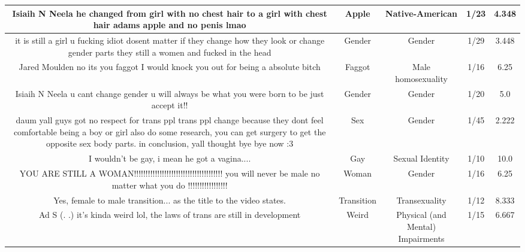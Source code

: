 \documentclass[11pt]{article}
\newlength\mylength
\begin{document}
\begin{center}
\begin{longtable}{|C{.40\mylength}|C{.30\mylength}|C{.15\mylength}|C{.15\mylength}|C{.15\mylength}|}
   Isiaih N Neela he changed from girl with no chest hair to a girl with chest hair adams apple and no penis lmao  & Apple & Native-American & 1/23 & 4.348 \\  \hline
  it is still a girl u fucking idiot dosent matter if they change how they look or change gender parts they still a women and fucked in the head  & Gender & Gender & 1/29 & 3.448 \\  \hline
   Jared Moulden no its you faggot I would knock you out for being a absolute bitch  & Faggot & Male homosexuality & 1/16 & 6.25 \\  \hline
  Isiaih N Neela u cant change gender u will always be what you were born to be just accept it!!  & Gender & Gender & 1/20 & 5.0 \\  \hline
  daum yall guys got no respect for trans ppl  trans ppl  change because they dont feel comfortable being a boy or girl  also do some research, you can get surgery to get the opposite sex body parts.  in conclusion, yall thought bye bye now :3  & Sex & Gender & 1/45 & 2.222 \\  \hline
  I wouldn't be gay, i mean he got a vagina....  & Gay & Sexual Identity & 1/10 & 10.0 \\  \hline
  YOU ARE STILL A WOMAN!!!!!!!!!!!!!!!!!!!!!!!!!!!!!!!!!!!!!! you will never be male no matter what you do !!!!!!!!!!!!!!!!!  & Woman & Gender & 1/16 & 6.25 \\  \hline
  Yes, female to male transition... as the title to the video states.  & Transition & Transexuality & 1/12 & 8.333 \\  \hline
   Ad S (. .) it's kinda weird lol, the laws of trans are still in development  & Weird & Physical (and Mental) Impairments & 1/15 & 6.667 \\  \hline

\end{longtable}
\end{center}
\end{document}
